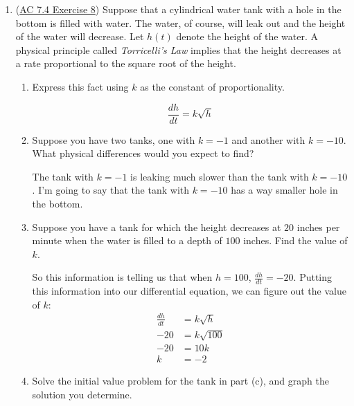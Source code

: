 \begin{enumerate}[leftmargin=0pt]
\begin{enumerate}
    \begin{red}
    Yeah, so that slope is wild: $\frac{dy}{dt} = -\frac{t}{y} = -\frac{8}{0}$. (Indeed, the tangent line to the side of the circle is vertical and thus has an undefined slope.)
    \end{red}
\end{enumerate}

\item (\href{https://activecalculus.org/single/sec-7-4-separable.html#FxE}{AC 7.4 Exercise 8}) Suppose that a cylindrical water tank with a hole in the bottom is filled with water. The water, of course, will leak out and the height of the water will decrease. Let $h(t)$ denote the height of the water. A physical principle called \textit{Torricelli's Law} implies that the height decreases at a rate proportional to the square root of the height.
\begin{enumerate}
    \item Express this fact using $k$ as the constant of proportionality.
    
    \begin{red}
    \[\frac{dh}{dt} = k\sqrt{h}\]
    \end{red}
    \item Suppose you have two tanks, one with $k = -1$ and another with $k=-10$. What physical differences would you expect to find?
    
    \begin{red}
    The tank with $k=-1$ is leaking much slower than the tank with $k=-10$. I'm going to say that the tank with $k=-10$ has a way smaller hole in the bottom.
    \end{red}
    \item Suppose you have a tank for which the height decreases at $20$ inches per minute when the water is filled to a depth of $100$ inches. Find the value of $k$.
    
    \begin{red}
    So this information is telling us that when $h = 100$, $\frac{dh}{dt} = -20$. Putting this information into our differential equation, we can figure out the value of $k$:
    \begin{align*}
        \frac{dh}{dt} &= k\sqrt{h} \\
        -20 &= k\sqrt{100} \\
        -20 &= 10k \\
        k &= -2
    \end{align*}
    \end{red}
    \item Solve the initial value problem for the tank in part (c), and graph the solution you determine.
    

\end{enumerate}
\end{enumerate}
